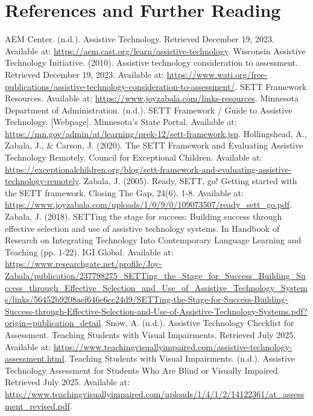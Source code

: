 \section{References and Further Reading}
\begin{thebibliography}{99}
 AEM Center. (n.d.). Assistive Technology. Retrieved December 19, 2023. Available at: \url{https://aem.cast.org/learn/assistive-technology}.
 Wisconsin Assistive Technology Initiative. (2010). Assistive technology consideration to assessment. Retrieved December 19, 2023. Available at: \url{https://www.wati.org/free-publications/assistive-technology-consideration-to-assessment/}.
 SETT Framework Resources. Available at: \url{https://www.joyzabala.com/links-resources}.
 Minnesota Department of Administration. (n.d.). SETT Framework / Guide to Assistive Technology. [Webpage]. Minnesota's State Portal. Available at: \url{https://mn.gov/admin/at/learning/prek-12/sett-framework.jsp}.
 Hollingshead, A., Zabala, J., \& Carson, J. (2020). The SETT Framework and Evaluating Assistive Technology Remotely. Council for Exceptional Children. Available at: \url{https://exceptionalchildren.org/blog/sett-framework-and-evaluating-assistive-technology-remotely}.
 Zabala, J. (2005). Ready, SETT, go! Getting started with the SETT framework. Closing The Gap, 24(6), 1-8. Available at: \url{https://www.joyzabala.com/uploads/1/0/9/0/109073507/ready_sett_go.pdf}.
 Zabala, J. (2018). SETTing the stage for success: Building success through effective selection and use of assistive technology systems. In Handbook of Research on Integrating Technology Into Contemporary Language Learning and Teaching (pp. 1-22). IGI Global. Available at: \url{https://www.researchgate.net/profile/Joy-Zabala/publication/237798275_SETTing_the_Stage_for_Success_Building_Success_through_Effective_Selection_and_Use_of_Assistive_Technology_Systems/links/56452b9208aef646e6cc24d9/SETTing-the-Stage-for-Success-Building-Success-through-Effective-Selection-and-Use-of-Assistive-Technology-Systems.pdf?origin=publication_detail}.
 Snow, A. (n.d.). Assistive Technology Checklist for Assessment. Teaching Students with Visual Impairments. Retrieved July 2025. Available at: \url{https://www.teachingvisuallyimpaired.com/assistive-technology-assessment.html}.
 Teaching Students with Visual Impairments. (n.d.). Assistive Technology Assessment for Students Who Are Blind or Visually Impaired. Retrieved July 2025. Available at: \url{http://www.teachingvisuallyimpaired.com/uploads/1/4/1/2/14122361/at_assessment_revised.pdf}.

\end{thebibliography}

